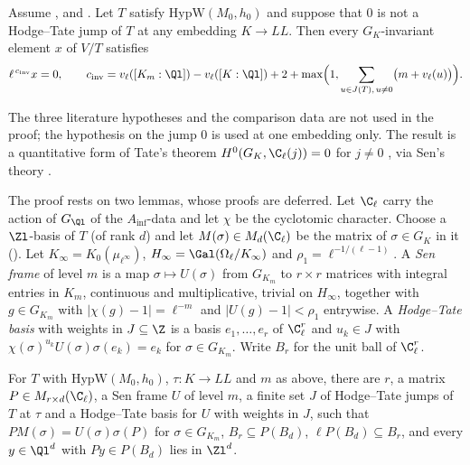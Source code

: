 \begin{theorem}\label{pf:sh-hodge:tek}
Assume \shhodgeBK, \shhodgeLTD{} and \shhodgeLEC. Let $T$ satisfy $\mathrm{HypW}(M_0,h_0)$ and suppose that $0$ is not a Hodge--Tate jump of
$T$ at any embedding $K\to\mathit{LL}$. Then every $G_K$-invariant element $x$ of $V/T$ satisfies
\[
\ell^{\,c_{\mathrm{inv}}}x=0,\qquad c_{\mathrm{inv}}=v_\ell([K_m:\Ql])-v_\ell([K:\Ql])+2+\max\Bigl(1,\sum_{u\in J(T),\,u\ne0}\bigl(m+v_\ell(u)\bigr)\Bigr).
\]
\end{theorem}

\begin{remark}\label{pf:sh-hodge:tekrem}
The three literature hypotheses and the comparison data are not used in the proof; the hypothesis on the jump $0$ is used at one
embedding only. The result is a quantitative form of Tate's theorem $H^0(G_K,\C_\ell(j))=0$ for $j\ne0$ \cite[\S3]{Tate1967pdiv}, via
Sen's theory \cite{Sen1980}.
\end{remark}

The proof rests on two lemmas, whose proofs are deferred. Let $\C_\ell$ carry the action of $G_{\Ql}$ of the $A_{\inf}$-data and let
$\chi$ be the cyclotomic character. Choose a $\Zl$-basis of $T$ (of rank $d$) and let $M(\sigma)\in M_d(\C_\ell)$ be the matrix of
$\sigma\in G_K$ in it (). Let $K_\infty=K_0(\mu_{\ell^\infty})$,
$H_\infty=\Gal(\Omega_\ell/K_\infty)$ and $\rho_1=\ell^{-1/(\ell-1)}$. A \emph{Sen frame} of level $m$ is a map $\sigma\mapsto U(\sigma)$ from
$G_{K_m}$ to $r\times r$ matrices with integral entries in $K_m$, continuous and multiplicative, trivial on $H_\infty$, together with
$g\in G_{K_m}$ with $|\chi(g)-1|=\ell^{-m}$ and $|U(g)-1|<\rho_1$ entrywise. A \emph{Hodge--Tate basis} with weights in $J\subseteq\Z$ is a basis
$e_1,\dots,e_r$ of $\C_\ell^r$ and $u_k\in J$ with $\chi(\sigma)^{u_k}U(\sigma)\sigma(e_k)=e_k$ for $\sigma\in G_{K_m}$. Write $B_r$ for the unit ball of
$\C_\ell^r$.

\begin{lemma}[Frames]\label{pf:sh-hodge:frame}
For $T$ with $\mathrm{HypW}(M_0,h_0)$, $\tau\colon K\to\mathit{LL}$ and $m$ as above, there are $r$, a matrix $P\in M_{r\times d}(\C_\ell)$, a Sen frame
$U$ of level $m$, a finite set $J$ of Hodge--Tate jumps of $T$ at $\tau$ and a Hodge--Tate basis for $U$ with weights in $J$, such that
$PM(\sigma)=U(\sigma)\sigma(P)$ for $\sigma\in G_{K_m}$, $B_r\subseteq P(B_d)$, $\ell P(B_d)\subseteq B_r$, and every $y\in\Ql^d$ with $Py\in P(B_d)$
lies in $\Zl^d$.
\end{lemma}

